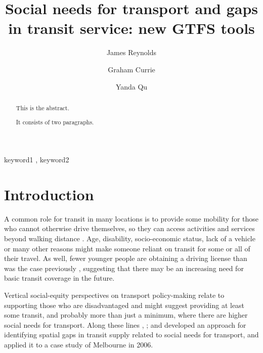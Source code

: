 \documentclass[preprint, 3p,
authoryear]{elsarticle} %
\begin{document}
\begin{frontmatter}

  \title{Social needs for transport and gaps in transit service: new
GTFS tools}
    \author[Public Transport Research Group (PTRG)]{James Reynolds%
  }
    \author[Public Transport Research Group (PTRG)]{Graham Currie%
  }
    \author[Public Transport Research Group (PTRG)]{Yanda Qu%
  }
  
  \begin{abstract}
  This is the abstract.

  It consists of two paragraphs.
  \end{abstract}
    \begin{keyword}
    keyword1 \sep 
    keyword2
  \end{keyword}
  
 \end{frontmatter}

\section{Introduction}\label{introduction}

A common role for transit in many locations is to provide some mobility
for those who cannot otherwise drive themselves, so they can access
activities and services beyond walking distance \citep{Currie:2016aa}.
Age, disability, socio-economic status, lack of a vehicle or many other
reasons might make someone reliant on transit for some or all of their
travel. As well, fewer younger people are obtaining a driving license
than was the case previously \citep{delbosc2013causes}, suggesting that
there may be an increasing need for basic transit coverage in the
future.

Vertical social-equity perspectives on transport policy-making relate to
supporting those who are disadvantaged \citep{Litman:2016aa} and might
suggest providing at least some transit, and probably more than just a
minimum, where there are higher social needs for transport. Along these
lines \citet{Currie2003Hobart}, \citet{Currie2004Gap};
\citet{Currie2007Identifying} and \citet{currie2010identifying}
developed an approach for identifying spatial gaps in transit supply
related to social needs for transport, and applied it to a case study of
Melbourne in 2006.
\end{document}
